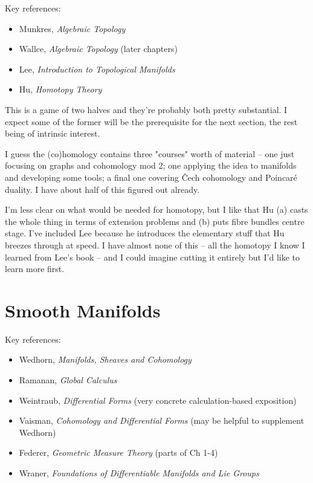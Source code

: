 \documentclass[article]{article}
\begin{document}
Key references:
\begin{itemize}
	\item{Munkres, \textit{Algebraic Topology}}
	\item{Wallce, \textit{Algebraic Topology} (later chapters)}
	\item{Lee, \textit{Introduction to Topological Manifolds}}
	\item{Hu, \textit{Homotopy Theory}}
\end{itemize}

This is a game of two halves and they're probably both pretty substantial. I expect some of the former will be the prerequisite for the next section, the rest being of intrinsic interest.

I guess the (co)homology contains three "courses" worth of material -- one just focusing on graphs and cohomology mod 2; one applying the idea to manifolds and developing some tools; a final one covering \v{C}ech cohomology and Poincar\'e duality. I have about half of this figured out already.

I'm less clear on what would be needed for homotopy, but I like that Hu (a) casts the whole thing in terms of extension problems and (b) puts fibre bundles centre stage. I've included Lee because he introduces the elementary stuff that Hu breezes through at speed. I have almost none of this -- all the homotopy I know I learned from Lee's book -- and I could imagine cutting it entirely but I'd like to learn more first.

\section{Smooth Manifolds}

Key references:
\begin{itemize}
	\item{Wedhorn, \textit{Manifolds, Sheaves and Cohomology}}
	\item{Ramanan, \textit{Global Calculus}}
	\item{Weintraub, \textit{Differential Forms} (very concrete calculation-based exposition)}
	\item{Vaisman, \textit{Cohomology and Differential Forms} (may be helpful to supplement Wedhorn)}
	\item{Federer, \textit{Geometric Measure Theory} (parts of Ch 1-4)}
	\item{Wraner, \textit{Foundations of Differentiable Manifolds and Lie Groups}}
\end{itemize}
\end{document}
